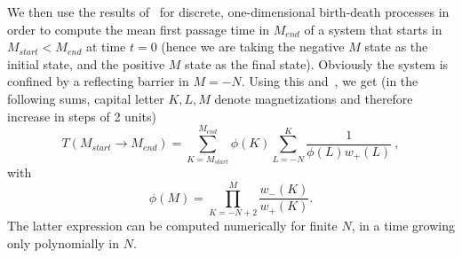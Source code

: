 \documentclass[aps,twocolumn,floats,pre,amsmath,superscriptaddress]{revtex4}
\newcommand{\beq}{\begin{equation}}
\newcommand{\eeq}{\end{equation}}
\def\to{\rightarrow} \def\la{\langle} \def\ra{\rangle}
\newcommand{\<}{\langle}
\renewcommand{\>}{\rangle}
\begin{document}
We then use the results of~\cite[Section 7.4]{gardiner} for discrete, one-dimensional birth-death processes
in order to compute the mean
first passage time in $M_{end}$
of a system that starts in $M_{start} < M_{end}$ at time $t=0$ (hence we are taking the negative $M$ state
as the initial state, and the positive $M$ state as the final state).
Obviously the system is confined by a reflecting barrier in $M = -N$.
Using this and~\cite[Eq.~(7.4.12)]{gardiner}, we get
(in the following sums, capital letter $K,L,M$ 
denote magnetizations and therefore increase in steps of 2 units)
\beq\label{MF_MFPT}
T(M_{start} \to  M_{end}) = \sum_{K = M_{start}}^{M_{end}} \phi(K) \sum_{L=-N}^K \frac{1}{\phi(L) w_+(L)} \ ,
\eeq
with
\beq
\phi(M) = \prod_{K=-N+2}^M \frac{w_-(K)}{w_+(K)}.
\eeq
The latter expression can be computed numerically for finite $N$, in a time growing only polynomially in $N$.
\end{document}
